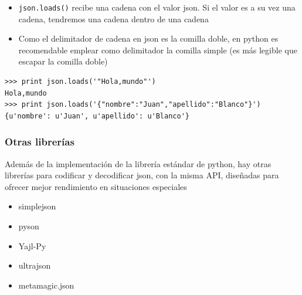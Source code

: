 \documentclass[ucs]{beamer}
\begin{document}
\begin{frame}[fragile]
\frametitle{}
\begin{itemize}
\item
\verb|json.loads()| recibe una cadena con el valor json. Si el valor es a su
vez una cadena, tendremos una cadena dentro de una cadena
\item
Como el delimitador de cadena en json es la comilla doble, en python es recomendable
emplear como delimitador la comilla simple (es más legible que escapar la comilla doble)
\end{itemize}

  \begin{footnotesize}
  \begin{verbatim}
>>> print json.loads('"Hola,mundo"')
Hola,mundo
>>> print json.loads('{"nombre":"Juan","apellido":"Blanco"}')
{u'nombre': u'Juan', u'apellido': u'Blanco'}
  \end{verbatim}
  \end{footnotesize}

\end{frame}


\begin{frame}[fragile]
\frametitle{Otras librerías}
Además de la implementación de la librería estándar de python,
hay otras librerías para codificar y decodificar json, con la misma API, diseñadas para ofrecer mejor
rendimiento en situaciones especiales
\begin{itemize}
\item
simplejson
\item
pyson
\item
Yajl-Py
\item
ultrajson
\item
metamagic.json
\end{itemize}

\end{frame}
\end{document}
